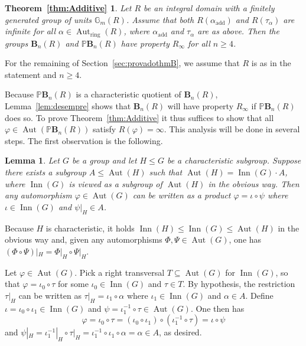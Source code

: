 \documentclass[a4paper,11pt]{amsart}
\makeatletter
\numberwithin{equation}{section}
\theoremstyle{plain}
\newtheorem{lem}[thm]{Lemma}
\theoremstyle{definition}
\renewenvironment{proof}[1][\proofname] {\par\pushQED{\qed}\normalfont\topsep6\p@\@plus6\p@\relax\trivlist\item[\hskip\labelsep\bfseries#1\@addpunct{.}]\ignorespaces}{\popQED\endtrivlist\@endpefalse}
\newcommand{\anel}[1]{#1_{\text{ring}}} %
\newcommand{\addi}[1]{#1_{\text{add}}} %
\newcommand{\Mult}{\mathbb{G}_{m}} %
\newcommand{\mbB}{\mathbf{B}} %
\newcommand{\PB}{\mathbb{P}\mathbf{B}} %
\newcommand{\phee}{\varphi} %
\newcommand{\Ri}{R_{\infty}} %
\DeclareMathOperator{\Aut}{Aut}
\DeclareMathOperator{\Inn}{Inn}
\makeatother
\begin{document}
\theoremstyle{plain}
\newtheorem*{thmB}{Theorem~\ref{thm:Additive}}
\begin{thmB} Let $R$ be an integral domain with a \emph{finitely generated} group of units $\Mult(R)$. Assume that both $R(\addi{\alpha})$ and $R(\tau_\alpha)$ are infinite for all $\alpha \in \anel{\Aut}(R)$, where $\addi{\alpha}$ and $\tau_\alpha$ are as above. Then the groups $\mbB_n(R)$ and $\PB_n(R)$ have property $\Ri$ for all $n \geq 4$.
\end{thmB}

For the remaining of Section~\ref{sec:provadothmB}, we assume that $R$ is as in the statement and $n \geq 4$. 

Because $\PB_n(R)$ is a characteristic quotient of $\mbB_n(R)$, Lemma~\ref{lem:desempre} shows that $\mbB_n(R)$ will have property $\Ri$ if $\PB_n(R)$ does so. To prove Theorem~\ref{thm:Additive} it thus suffices to show that all $\phee \in \Aut(\PB_n(R))$ satisfy $R(\phee)=\infty$. This analysis will be done in several steps. The first observation is the following. 

\begin{lem}\label{lem:useless}
Let $G$ be a group and let $H \leq G$ be a characteristic subgroup. Suppose there exists a subgroup $A \leq \Aut(H)$ such that $\Aut(H) = \Inn(G) \cdot A$, where $\Inn(G)$ is viewed as a subgroup of $\Aut(H)$ in the obvious way. Then any automorphism $\phee \in \Aut(G)$ can be written as a product $\phee = \iota \circ \psi$ where $\iota \in \Inn(G)$ and $\psi|_H \in A$.
\end{lem}

\begin{proof}
Because $H$ is characteristic, it holds $\Inn(H) \leq \Inn(G) \leq \Aut(H)$ in the obvious way and, given any automorphisms $\Phi, \Psi \in \Aut(G)$, one has $(\Phi \circ \Psi)|_H = \Phi|_H \circ \Psi|_H$. 

Let $\phee \in \Aut(G)$. Pick a right transversal $T \subseteq \Aut(G)$ for $\Inn(G)$, so that $\phee = \iota_0 \circ \tau$ for some $\iota_0 \in \Inn(G)$ and $\tau \in T$. By hypothesis, the restriction $\tau|_H$ can be written as $\tau|_H = \iota_1 \circ \alpha$ where $\iota_1 \in \Inn(G)$ and $\alpha \in A$. Define $\iota = \iota_0 \circ \iota_1 \in \Inn(G)$ and $\psi = \iota_1^{-1} \circ \tau \in \Aut(G)$. One then has
\[ \phee = \iota_0 \circ \tau = (\iota_0 \circ \iota_1) \circ (\iota_1^{-1} \circ \tau) = \iota \circ \psi \]
and $\psi|_H = \iota_1^{-1}|_H \circ \tau|_H = \iota_1^{-1} \circ \iota_1 \circ \alpha = \alpha \in A$, as desired.
\end{proof}
\end{document}
